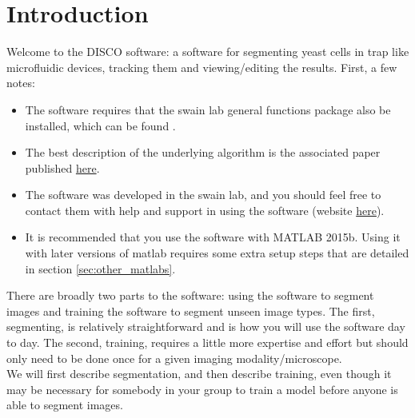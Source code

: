 \section{Introduction}
\label{sec:intro}
 
 Welcome to the DISCO software: a software for segmenting yeast cells in trap like microfluidic devices, tracking them and viewing/editing the results. First, a few notes:
 \begin{itemize}
 	\item The software requires that the swain lab general functions package also be installed, which can be found .
 	\item The best description of the underlying algorithm is the associated paper published \href{https://academic.oup.com/bioinformatics/article-abstract/doi/10.1093/bioinformatics/btx550/4103414?redirectedFrom=fulltext}{here}.
 	\item The software was developed in the swain lab, and you should feel free to contact them with help and support in using the software (website \href{http://swainlab.bio.ed.ac.uk/}{here}).
 	\item It is recommended that you use the software with MATLAB 2015b. Using it with later versions of matlab requires some extra setup steps that are detailed in section \ref{sec:other_matlabs}.
 \end{itemize}
 
 There are broadly two parts to the software: using the software to segment images and training the software to segment unseen image types. The first, segmenting, is relatively straightforward and is how you will use the software day to day. The second, training, requires a little more expertise and effort but should only need to be done once for a given imaging modality/microscope. \\
 We will first describe segmentation, and then describe training, even though it may be necessary for somebody in your group to train a model before anyone is able to segment images.